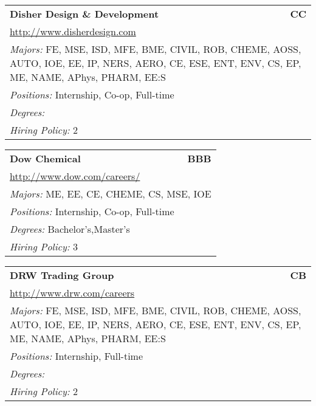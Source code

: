 \documentclass[twoside]{article}
\begin{document}
\begin{center}
\begin{multicols}{3}
\begin{FlushLeft}
\begin{minipage}{\columnwidth}\begin{tabularx}{.95\columnwidth}{Xr}
                 {\Large\bf Disher Design \& Development} & {\Large\bf CC}\\
    \multicolumn{2}{p{.95\columnwidth}}{\url{http://www.disherdesign.com}}\\
    \multicolumn{2}{p{.95\columnwidth}}{\emph{Majors:} FE, MSE, ISD, MFE, BME, CIVIL, ROB, CHEME, AOSS, AUTO, IOE, EE, IP, NERS, AERO, CE, ESE, ENT, ENV, CS, EP, ME, NAME, APhys, PHARM, EE:S}\\
    \multicolumn{2}{p{.95\columnwidth}}{\emph{Positions:} Internship, Co-op, Full-time}\\
    \multicolumn{2}{p{.95\columnwidth}}{\emph{Degrees:} }\\
    \multicolumn{2}{p{.95\columnwidth}}{\emph{Hiring Policy:} 2}\\
    \end{tabularx}
    
\end{minipage}
 
\begin{minipage}{\columnwidth}\begin{tabularx}{.95\columnwidth}{Xr}
                 {\Large\bf Dow Chemical} & {\Large\bf BBB}\\
    \multicolumn{2}{p{.95\columnwidth}}{\url{http://www.dow.com/careers/}}\\
    \multicolumn{2}{p{.95\columnwidth}}{\emph{Majors:} ME, EE, CE, CHEME, CS, MSE, IOE}\\
    \multicolumn{2}{p{.95\columnwidth}}{\emph{Positions:} Internship, Co-op, Full-time}\\
    \multicolumn{2}{p{.95\columnwidth}}{\emph{Degrees:} Bachelor's,Master's}\\
    \multicolumn{2}{p{.95\columnwidth}}{\emph{Hiring Policy:} 3}\\
    \end{tabularx}
    
\end{minipage}
 
\begin{minipage}{\columnwidth}\begin{tabularx}{.95\columnwidth}{Xr}
                 {\Large\bf DRW Trading Group} & {\Large\bf CB}\\
    \multicolumn{2}{p{.95\columnwidth}}{\url{http://www.drw.com/careers}}\\
    \multicolumn{2}{p{.95\columnwidth}}{\emph{Majors:} FE, MSE, ISD, MFE, BME, CIVIL, ROB, CHEME, AOSS, AUTO, IOE, EE, IP, NERS, AERO, CE, ESE, ENT, ENV, CS, EP, ME, NAME, APhys, PHARM, EE:S}\\
    \multicolumn{2}{p{.95\columnwidth}}{\emph{Positions:} Internship, Full-time}\\
    \multicolumn{2}{p{.95\columnwidth}}{\emph{Degrees:} }\\
    \multicolumn{2}{p{.95\columnwidth}}{\emph{Hiring Policy:} 2}\\
    \end{tabularx}
    

\end{minipage}
\end{FlushLeft}
\end{multicols}
\end{center}
\end{document}
